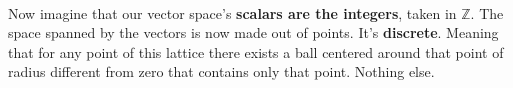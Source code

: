 \documentclass[a4paper,11pt]{article}
\begin{document}
\\

Now imagine that our vector space's \textbf{scalars are the integers}, taken in $\mathbb{Z}$. The space spanned by the vectors is now made out of points. It's \textbf{discrete}. Meaning that for any point of this lattice there exists a ball centered around that point of radius different from zero that contains only that point. Nothing else.\\
\end{document}

